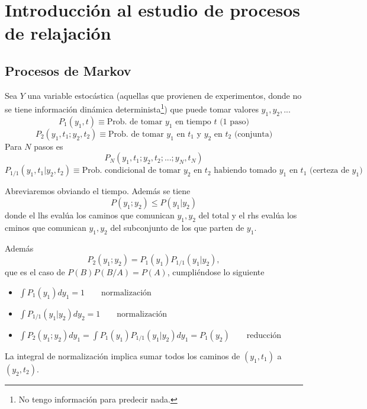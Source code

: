 \documentclass[10pt,oneside]{CBFT_book}
\begin{document}
\chapter{Introducción al estudio de procesos de relajación}


\section{Procesos de Markov}

Sea $Y$ una variable estocástica (aquellas que provienen de experimentos, donde no se tiene información
dinámica determinista\footnote{No tengo información para predecir nada.}) 
que puede tomar valores $y_1, y_2,...$
\[
	P_1(y_1,t) \equiv \text{Prob. de tomar $y_1$ en tiempo $t$ (1 paso)}
\]
\[
	P_2(y_1,t_1;y_2,t_2) \equiv \text{Prob. de tomar $y_1$ en $t_1$ y $y_2$ en $t_2$ (conjunta)}
\]
Para $N$ pasos es
\[
	P_N(y_1,t_1;y_2,t_2; ...; y_N,t_N) 
\]
\[
	P_{1/1}(y_1,t_1 | y_2, t_2) \equiv \text{Prob. condicional de tomar $y_2$ en $t_2$ habiendo 
	tomado $y_1$ en $t_1$ (certeza de $y_1$) }
\]

Abreviaremos obviando el tiempo. Además se tiene 
\[
	P(y_1;y_2) \leq P(y_1 | y_2)
\]
donde el lhs evalúa los caminos que comunican $y_1, y_2$ del total y el rhs evalúa los cminos que comunican
$y_1, y_2$ del subconjunto de los que parten de $y_1$.

Además
\[
	P_2(y_1;y_2) = P_1(y_1) P_{1/1}(y_1|y_2),
\]
que es el caso de $P(B)P(B/A)=P(A)$, cumpliéndose lo siguiente
\begin{itemize}
	\item $ \int P_1(y_1) dy_1 = 1 \qquad  \text{normalización} $ 
	\item $ \int P_{1/1}(y_1|y_2) dy_2 = 1 \qquad \text{normalización} $ 
	\item $ \int P_2(y_1;y_2) dy_1 = \int P_1(y_1) P_{1/1}(y_1|y_2) dy_1 =  P_1(y_2) 
	\qquad \text{reducción} $
\end{itemize}
La integral de normalización implica sumar todos los caminos de $(y_1,t_1)$ a $(y_2,t_2)$.
\end{document}
